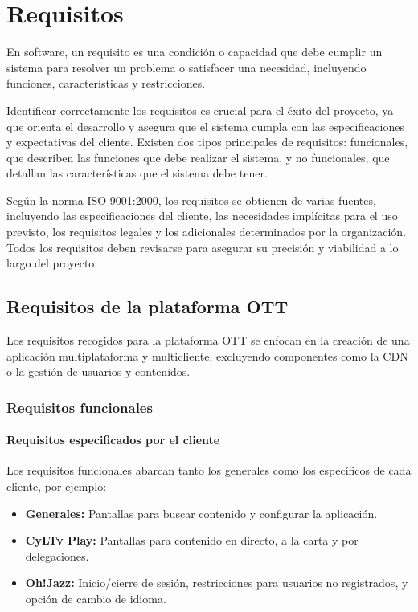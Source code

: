 \section{Requisitos}
\label{sec:analisis_requisitos}

En software, un requisito es una condición o capacidad que debe cumplir un sistema para resolver 
un problema o satisfacer una necesidad, incluyendo funciones, características y restricciones.

Identificar correctamente los requisitos es crucial para el éxito del proyecto, ya que orienta 
el desarrollo y asegura que el sistema cumpla con las especificaciones y expectativas del cliente. 
Existen dos tipos principales de requisitos: funcionales, que describen las funciones que debe realizar 
el sistema, y no funcionales, que detallan las características que el sistema debe tener.

Según la norma ISO 9001:2000, los requisitos se obtienen de varias fuentes, incluyendo las especificaciones 
del cliente, las necesidades implícitas para el uso previsto, los requisitos legales y los adicionales 
determinados por la organización. Todos los requisitos deben revisarse para asegurar su precisión y 
viabilidad a lo largo del proyecto.

\subsection{Requisitos de la plataforma OTT}
\label{subsec:analisis_requisitos_plataforma_ott}

Los requisitos recogidos para la plataforma OTT se enfocan en la creación de una aplicación multiplataforma y 
multicliente, excluyendo componentes como la CDN o la gestión de usuarios y contenidos.

\subsubsection{Requisitos funcionales}
\label{subsubsec:analisis_requisitos_funcionales}

\paragraph{Requisitos especificados por el cliente}
\label{par:analisis_requisitos_funcionales_cliente}

Los requisitos funcionales abarcan tanto los generales como los específicos de cada cliente, por ejemplo:

\begin{itemize}
    \item \textbf{Generales:} Pantallas para buscar contenido y configurar la aplicación.
    \item \textbf{CyLTv Play:} Pantallas para contenido en directo, a la carta y por delegaciones.
    \item \textbf{Oh!Jazz:} Inicio/cierre de sesión, restricciones para usuarios no registrados, y opción de cambio de idioma.
\end{itemize}

